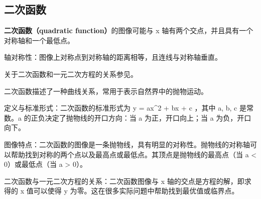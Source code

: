 \subsection{二次函数}

\textbf{二次函数（quadratic function）}的图像可能与  x  轴有两个交点，并且具有一个对称轴和一个最低点。

轴对称性：图像上对称点到对称轴的距离相等，且连线与对称轴垂直。

关于二次函数和一元二次方程的关系参见。

二次函数描述了一种曲线关系，常用于表示自然界中的抛物运动。

定义与标准形式：二次函数的标准形式为  y = ax^2 + bx + c ，其中 a, b, c 是常数。a 的正负决定了抛物线的开口方向：当 a 为正，开口向上；当 a 为负，开口向下。

图像特点：二次函数的图像是一条抛物线，具有明显的对称性。抛物线的对称轴可以帮助找到对称的两个点以及最高点或最低点。其顶点是抛物线的最高点（当 a < 0）或最低点（当 a > 0）。

二次函数与一元二次方程的关系：二次函数图像与 x 轴的交点是方程的解，即求得的 x 值可以使得 y 为零。这在很多实际问题中帮助找到最优值或临界点。
